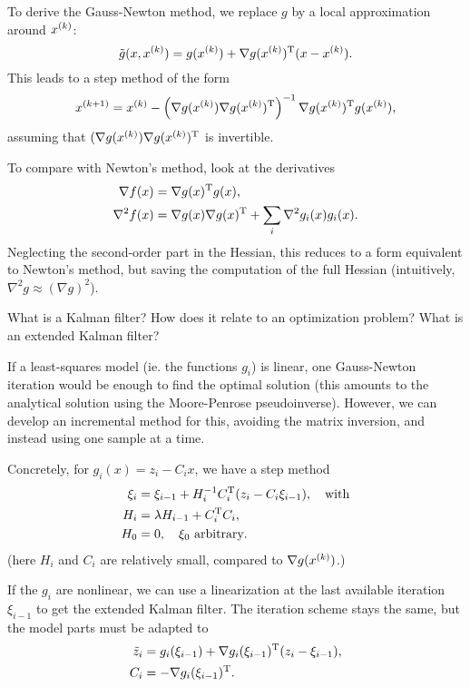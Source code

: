 \documentclass{article}
\begin{document}
To derive the Gauss-Newton method, we replace \(g\) by a local approximation around \(\kth{x}\):
\begin{equation*}
  \tilde{g}(x, \kth{x}) = g(\kth{x}) + \T{\nabla g(\kth{x})}(x - \kth{x}).
\end{equation*}
This leads to a step method of the form
\begin{equation*}
  \kth[k+1]{x} = \kth{x} - \left(\nabla g(\kth{x}) \T{\nabla g(\kth{x})}\right)^{-1} \T{\nabla g(\kth{x})} g(\kth{x}),
\end{equation*}
assuming that \((\nabla g(\kth{x}) \T{\nabla g(\kth{x})}\) is invertible.

To compare with Newton's method, look at the derivatives
\begin{align*}
  \nabla f(x) &= \T{\nabla g(x)} g(x), \\
  \nabla^2 f(x) &= \nabla g(x) \T{\nabla g(x)} + \sum_i \nabla^2 g_i(x) g_i(x).
\end{align*}
Neglecting the second-order part in the Hessian, this reduces to a form equivalent to Newton's
method, but saving the computation of the full Hessian (intuitively,
\(\nabla^2 g \approx (\nabla g)^2\)).


\begin{question}
  What is a Kalman filter? How does it relate to an optimization problem?  What is an extended
  Kalman filter?
\end{question}

If a least-squares model (ie. the functions \(g_i\)) is linear, one Gauss-Newton iteration would be
enough to find the optimal solution (this amounts to the analytical solution using the Moore-Penrose
pseudoinverse).  However, we can develop an incremental method for this, avoiding the matrix
inversion, and instead using one sample at a time.

Concretely, for \(g_i(x) = z_i - C_i x\), we have a step method
\begin{align*}
  \xi_i &= \xi_{i-1} + H_i^{-1}\T{C_i}(z_i - C_i \xi_{i-1}), \quad\text{with} \\
  H_i &= \lambda H_{i-1} + \T{C_i}C_i, \\
  H_0 &= 0,\quad \xi_0 \text{ arbitrary}.
\end{align*}
(here \(H_i\) and \(C_i\) are relatively small, compared to \(\nabla g(\kth{x})\).)

If the \(g_i\) are nonlinear, we can use a linearization at the last available iteration
\(\xi_{i-1}\) to get the extended Kalman filter.  The iteration scheme stays the same, but the model
parts must be adapted to
\begin{align*}
  \tilde{z}_i &= g_i(\xi_{i-1}) + \T{\nabla g_i(\xi_{i-1})}(z_i - \xi_{i-1}), \\
  C_i &= - \T{\nabla g_i(\xi_{i-1})}.
\end{align*}
\end{document}
